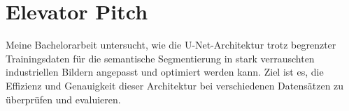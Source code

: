 \chapter{Elevator Pitch}\label{sec:exp_elevator}
Meine Bachelorarbeit untersucht, wie die U-Net-Architektur trotz begrenzter Trainingsdaten für die semantische Segmentierung in stark verrauschten industriellen Bildern angepasst und optimiert werden kann. Ziel ist es, die Effizienz und Genauigkeit dieser Architektur bei verschiedenen Datensätzen zu überprüfen und evaluieren.
